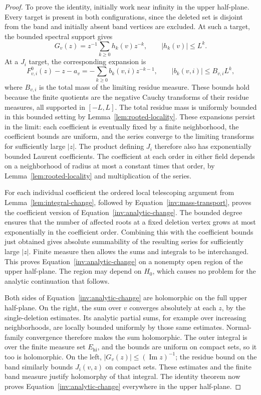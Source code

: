 \begin{proof}
To prove the identity, initially work near infinity in the upper
half-plane. Every target is present in both configurations, since the
deleted set is disjoint from the band and initially absent band vertices
are excluded. At such a target, the bounded spectral support gives
\[
 G_v(z)=z^{-1}\sum_{k\geq0}h_k(v)z^{-k},\qquad
                  |h_k(v)|\leq L^k.
\]
At a $J_i$ target, the corresponding expansion is
\[
 F_{v,i}^0(z)-z-a_v=-\sum_{k\geq0}b_k(v,i)z^{-k-1},\qquad
 |b_k(v,i)|\leq B_{v,i}L^k,
\]
where $B_{v,i}$ is the total mass of the limiting residue measure.
These bounds hold because the finite quotients are the negative Cauchy
transforms of their residue measures, all supported in $[-L,L]$.
The total residue mass is uniformly bounded in this bounded
setting by Lemma~\ref{lem:rooted-locality}.  These expansions persist in
the limit: each coefficient is eventually fixed by a finite
neighborhood, the coefficient bounds are uniform, and the series
converge to the limiting transforms for sufficiently large $|z|$.
The product defining $J_i$ therefore also has exponentially bounded
Laurent coefficients.  The coefficient at each order in either field
depends on a neighborhood of radius at most a constant times that
order, by Lemma~\ref{lem:rooted-locality} and multiplication of the
series.

For each individual coefficient the ordered local telescoping argument
from Lemma~\ref{lem:integral-change}, followed by
Equation~\eqref{inv:mass-transport}, proves the coefficient version of
Equation~\eqref{inv:analytic-change}.  The bounded degree ensures that
the number of affected roots at a fixed deletion vertex grows at most
exponentially in the coefficient order.  Combining this with the
coefficient bounds just obtained gives absolute summability of the
resulting series for sufficiently large $|z|$.  Finite measure then
allows the sums and integrals to be interchanged.  This proves
Equation~\eqref{inv:analytic-change} on a nonempty open region of the
upper half-plane.  The region may depend on $H_0$, which causes no
problem for the analytic continuation that follows.

Both sides of Equation~\eqref{inv:analytic-change} are holomorphic on
the full upper half-plane.  On the right, the sum over $v$ converges
absolutely at each $z$, by the single-deletion estimates.  Its analytic
partial sums, for example over increasing neighborhoods, are locally
bounded uniformly by those same estimates.  Normal-family convergence
therefore makes the sum holomorphic.  The outer integral is over the
finite measure set $E_{\mathrm{hi}}$, and the bounds are uniform on
compact sets, so it too is holomorphic.  On the left,
$|G_v(z)|\leq(\operatorname{Im}z)^{-1}$; the residue bound on the band
similarly bounds $J_i(v,z)$ on compact sets.  These estimates and the
finite band measure justify holomorphy of that integral.  The identity
theorem now proves Equation~\eqref{inv:analytic-change} everywhere in
the upper half-plane.


\end{proof}
